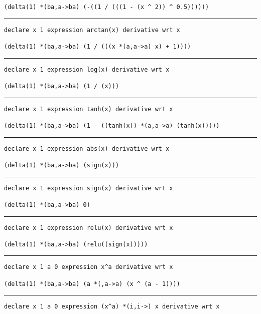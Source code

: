 \documentclass[12pt, a4paper]{report}
\begin{document}
\begin{multicols}{2}
\begin{verbatim}
(delta(1) *(ba,a->ba) (-((1 / (((1 - (x ^ 2)) ^ 0.5))))))
\end{verbatim}
\vspace{-20pt} \rule[-10pt]{\columnwidth}{0.1pt} 
\begin{verbatim}
declare x 1 expression arctan(x) derivative wrt x

(delta(1) *(ba,a->ba) (1 / (((x *(a,a->a) x) + 1))))
\end{verbatim}
\vspace{-20pt} \rule[-10pt]{\columnwidth}{0.1pt} 
\begin{verbatim}
declare x 1 expression log(x) derivative wrt x

(delta(1) *(ba,a->ba) (1 / (x)))
\end{verbatim}
\vspace{-20pt} \rule[-10pt]{\columnwidth}{0.1pt} 
\begin{verbatim}
declare x 1 expression tanh(x) derivative wrt x

(delta(1) *(ba,a->ba) (1 - ((tanh(x)) *(a,a->a) (tanh(x)))))
\end{verbatim}
\vspace{-20pt} \rule[-10pt]{\columnwidth}{0.1pt} 
\begin{verbatim}
declare x 1 expression abs(x) derivative wrt x

(delta(1) *(ba,a->ba) (sign(x)))
\end{verbatim}
\vspace{-20pt} \rule[-10pt]{\columnwidth}{0.1pt} 
\begin{verbatim}
declare x 1 expression sign(x) derivative wrt x

(delta(1) *(ba,a->ba) 0)
\end{verbatim}
\vspace{-20pt} \rule[-10pt]{\columnwidth}{0.1pt} 
\begin{verbatim}
declare x 1 expression relu(x) derivative wrt x

(delta(1) *(ba,a->ba) (relu((sign(x)))))
\end{verbatim}
\vspace{-20pt} \rule[-10pt]{\columnwidth}{0.1pt} 
\begin{verbatim}
declare x 1 a 0 expression x^a derivative wrt x

(delta(1) *(ba,a->ba) (a *(,a->a) (x ^ (a - 1))))
\end{verbatim}
\vspace{-20pt} \rule[-10pt]{\columnwidth}{0.1pt} 
\begin{verbatim}
declare x 1 a 0 expression (x^a) *(i,i->) x derivative wrt x


\end{verbatim}
\end{multicols}
\end{document}
